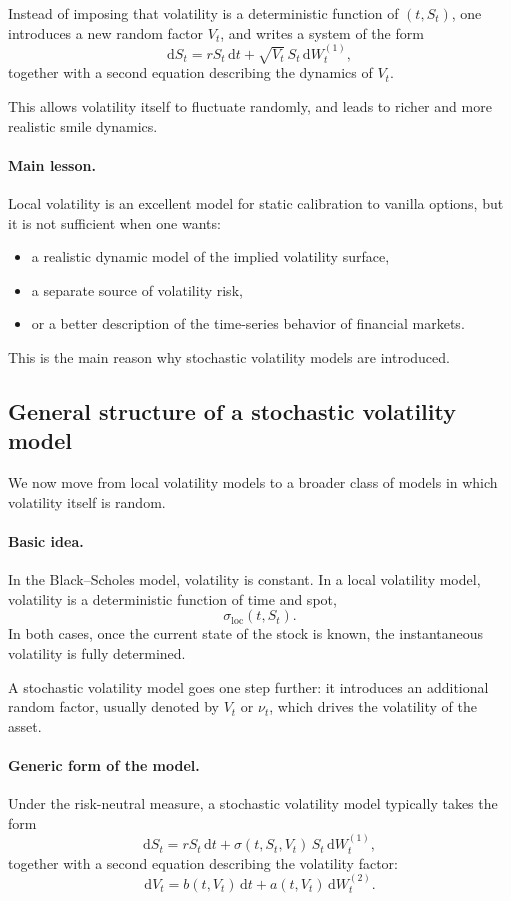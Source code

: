 \documentclass[11pt]{article}
\theoremstyle{plain}
\theoremstyle{definition}
\theoremstyle{remark}
\begin{document}
Instead of imposing that volatility is a deterministic function of
\((t,S_t)\), one introduces a new random factor \(V_t\), and writes a
system of the form
\[
\mathrm{d}S_t
=
rS_t\,\mathrm{d}t
+
\sqrt{V_t}\,S_t\,\mathrm{d}W_t^{(1)},
\]
together with a second equation describing the dynamics of \(V_t\).

This allows volatility itself to fluctuate randomly, and leads to richer
and more realistic smile dynamics.

\paragraph{Main lesson.}
Local volatility is an excellent model for static calibration to vanilla
options, but it is not sufficient when one wants:
\begin{itemize}[leftmargin=1.4em]
    \item a realistic dynamic model of the implied volatility surface,
    \item a separate source of volatility risk,
    \item or a better description of the time-series behavior of
    financial markets.
\end{itemize}

This is the main reason why stochastic volatility models are introduced.

\subsection{General structure of a stochastic volatility model}

We now move from local volatility models to a broader class of models in
which volatility itself is random.

\paragraph{Basic idea.}
In the Black--Scholes model, volatility is constant.
In a local volatility model, volatility is a deterministic function of
time and spot,
\[
\sigma_{\mathrm{loc}}(t,S_t).
\]
In both cases, once the current state of the stock is known, the
instantaneous volatility is fully determined.

A stochastic volatility model goes one step further:
it introduces an additional random factor, usually denoted by \(V_t\) or
\(\nu_t\), which drives the volatility of the asset.

\paragraph{Generic form of the model.}
Under the risk-neutral measure, a stochastic volatility model typically
takes the form
\[
\mathrm{d}S_t
=
rS_t\,\mathrm{d}t
+
\sigma(t,S_t,V_t)\,S_t\,\mathrm{d}W_t^{(1)},
\]
together with a second equation describing the volatility factor:
\[
\mathrm{d}V_t
=
b(t,V_t)\,\mathrm{d}t
+
a(t,V_t)\,\mathrm{d}W_t^{(2)}.
\]
\end{document}
